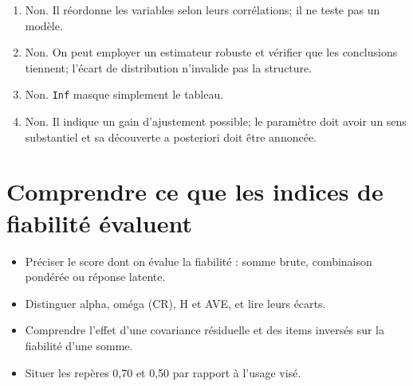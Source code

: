 \documentclass[
  french,
  11pt,
  a4paper,
  DIV=11,
  numbers=noendperiod]{scrreprt}
\providecommand{\tightlist}{%
  \setlength{\itemsep}{0pt}\setlength{\parskip}{0pt}}
\begin{document}
\begin{tcolorbox}[enhanced jigsaw, arc=.35mm, bottomrule=.15mm, bottomtitle=1mm, breakable, colback=white, colbacktitle=quarto-callout-tip-color!10!white, colframe=quarto-callout-tip-color-frame, coltitle=black, left=2mm, leftrule=.75mm, opacityback=0, opacitybacktitle=0.6, rightrule=.15mm, title={Réponses}, titlerule=0mm, toprule=.15mm, toptitle=1mm]

\begin{enumerate}
\def\labelenumi{\arabic{enumi}.}
\tightlist
\item
  Non. Il réordonne les variables selon leurs corrélations; il ne teste
  pas un modèle.
\item
  Non. On peut employer un estimateur robuste et vérifier que les
  conclusions tiennent; l'écart de distribution n'invalide pas la
  structure.
\item
  Non. \texttt{Inf} masque simplement le tableau.
\item
  Non. Il indique un gain d'ajustement possible; le paramètre doit avoir
  un sens substantiel et sa découverte a posteriori doit être annoncée.
\end{enumerate}

\end{tcolorbox}


\chapter{Comprendre ce que les indices de fiabilité
évaluent}\label{sec-fiabilite}

\begin{tcolorbox}[enhanced jigsaw, arc=.35mm, bottomrule=.15mm, bottomtitle=1mm, breakable, colback=white, colbacktitle=quarto-callout-note-color!10!white, colframe=quarto-callout-note-color-frame, coltitle=black, left=2mm, leftrule=.75mm, opacityback=0, opacitybacktitle=0.6, rightrule=.15mm, title={Objectifs du chapitre}, titlerule=0mm, toprule=.15mm, toptitle=1mm]

\begin{itemize}
\tightlist
\item
  Préciser le score dont on évalue la fiabilité : somme brute,
  combinaison pondérée ou réponse latente.
\item
  Distinguer alpha, oméga (CR), H et AVE, et lire leurs écarts.
\item
  Comprendre l'effet d'une covariance résiduelle et des items inversés
  sur la fiabilité d'une somme.
\item
  Situer les repères 0,70 et 0,50 par rapport à l'usage visé.
\end{itemize}

\end{tcolorbox}
\end{document}
